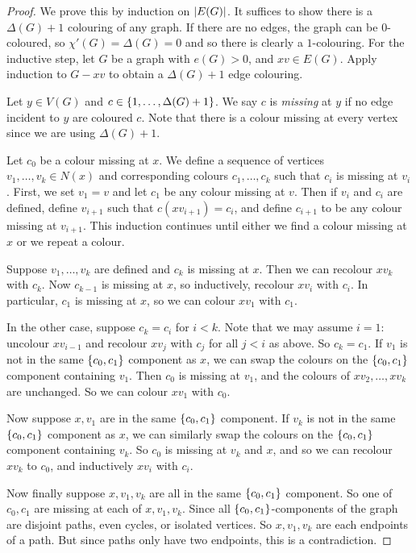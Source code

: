 \begin{proof}
	We prove this by induction on \( \abs{E(G)} \).
	It suffices to show there is a \( \Delta(G) + 1 \) colouring of any graph.
	If there are no edges, the graph can be \( 0 \)-coloured, so \( \chi'(G) = \Delta(G) = 0 \) and so there is clearly a \( 1 \)-colouring.
	For the inductive step, let \( G \) be a graph with \( e(G) > 0 \), and \( xv \in E(G) \).
	Apply induction to \( G - xv \) to obtain a \( \Delta(G) + 1 \) edge colouring.

	Let \( y \in V(G) \) and \( c \in \qty{1, \dots, \Delta(G) + 1} \).
	We say \( c \) is \emph{missing} at \( y \) if no edge incident to \( y \) are coloured \( c \).
	Note that there is a colour missing at every vertex since we are using \( \Delta(G) + 1 \).

	Let \( c_0 \) be a colour missing at \( x \).
	We define a sequence of vertices \( v_1, \dots, v_k \in N(x) \) and corresponding colours \( c_1, \dots, c_k \) such that \( c_i \) is missing at \( v_i \).
	First, we set \( v_1 = v \) and let \( c_1 \) be any colour missing at \( v \).
	Then if \( v_i \) and \( c_i \) are defined, define \( v_{i+1} \) such that \( c(xv_{i+1}) = c_i \), and define \( c_{i+1} \) to be any colour missing at \( v_{i+1} \).
	This induction continues until either we find a colour missing at \( x \) or we repeat a colour.

	Suppose \( v_1, \dots, v_k \) are defined and \( c_k \) is missing at \( x \).
	Then we can recolour \( xv_k \) with \( c_k \).
	Now \( c_{k-1} \) is missing at \( x \), so inductively, recolour \( xv_i \) with \( c_i \).
	In particular, \( c_1 \) is missing at \( x \), so we can colour \( xv_1 \) with \( c_1 \).

	In the other case, suppose \( c_k = c_i \) for \( i < k \).
	Note that we may assume \( i = 1 \): uncolour \( xv_{i-1} \) and recolour \( xv_j \) with \( c_j \) for all \( j < i \) as above.
	So \( c_k = c_1 \).
	If \( v_1 \) is not in the same \( \qty{c_0, c_1} \) component as \( x \), we can swap the colours on the \( \qty{c_0, c_1} \) component containing \( v_1 \).
	Then \( c_0 \) is missing at \( v_1 \), and the colours of \( xv_2, \dots, xv_k \) are unchanged.
	So we can colour \( xv_1 \) with \( c_0 \).

	Now suppose \( x, v_1 \) are in the same \( \qty{c_0, c_1} \) component.
	If \( v_k \) is not in the same \( \qty{c_0, c_1} \) component as \( x \), we can similarly swap the colours on the \( \qty{c_0, c_1} \) component containing \( v_k \).
	So \( c_0 \) is missing at \( v_k \) and \( x \), and so we can recolour \( xv_k \) to \( c_0 \), and inductively \( xv_i \) with \( c_i \).

	Now finally suppose \( x, v_1, v_k \) are all in the same \( \qty{c_0, c_1} \) component.
	So one of \( c_0, c_1 \) are missing at each of \( x, v_1, v_k \).
	Since all \( \qty{c_0, c_1} \)-components of the graph are disjoint paths, even cycles, or isolated vertices.
	So \( x, v_1, v_k \) are each endpoints of a path.
	But since paths only have two endpoints, this is a contradiction.
\end{proof}

